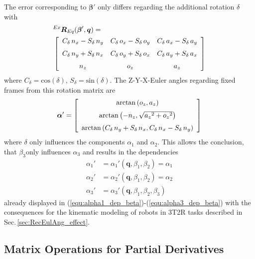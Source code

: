\documentclass[twocolumn,10pt]{IFTOMM}
\newcommand{\bm}[1]{\boldsymbol{#1}}
\newcommand{\rotmat}[2]{{{ }^{#1}\boldsymbol{R}}_{#2}}
\begin{document}
The error corresponding to $\bm{\beta}'$ only differs regarding the additional rotation $\delta$ with
%
\begin{align}
&\rotmat{Ex}{Eq}(\bm{\beta}',\bm{q})
= \\
&\left[ \begin {array}{ccc} { C_{\delta}}\,{n_x}-{ S_{\delta}}\,{ n_y}&{ C_{\delta}}\,{o_x}-{ S_{\delta}}\,{o_y}&{ C_{\delta}}\,{ a_x}-{ S_{\delta}}\,{a_y}\\ \noalign{\medskip}{ C_{\delta}}\,{n_y}+ { S_{\delta}}\,{n_x}&{ C_{\delta}}\,{o_y}+{ S_{\delta}}\,{o_x}&{  C_{\delta}}\,{a_y}+{ S_{\delta}}\,{a_x}\\ \noalign{\medskip}{ n_z}&{o_z}&{a_z}\end {array} \right] \nonumber
\end{align}
%
where $C_{\delta}=\mathrm{cos}(\delta)$, $S_{\delta}=\mathrm{sin}(\delta)$.
The Z-Y-X-Euler angles regarding fixed frames from this rotation matrix are
%
\begin{equation}
\bm{\alpha}' =
 \left[ \begin {array}{c} \arctan \left( {o_z},{a_z} \right)  \\
  \noalign{\medskip}\arctan \left( -{n_z},\sqrt {{{a_z}}^{2}+{{ o_z}}^{2}} \right) \\
  \noalign{\medskip}\arctan \left( {  C_{\delta}}\,{n_y}+{ S_{\delta}}\,{n_x},{ C_{\delta}}\,{n_x}-{  S_{\delta}}\,{n_y} \right) \end {array} \right] 
\end{equation}
%
where $\delta$  only influences the components $\alpha_1$ and $\alpha_2$.
This allows the conclusion, that $\beta_3$only influences $\alpha_3$ and results in the dependencies
%
\begin{align}
\alpha_1'&=\alpha_1'(\bm{q},\beta_1,\beta_2) =\alpha_1\\
\alpha_2'&=\alpha_2'(\bm{q},\beta_1,\beta_2) =\alpha_2\\
\alpha_3'&=\alpha_3'(\bm{q},\beta_1,\beta_2,\beta_3)
\end{align}
%
already displayed in (\ref{equ:alpha1_dep_beta})-(\ref{equ:alpha3_dep_beta}) with the consequences for the kinematic modeling of robots in 3T2R tasks described in Sec.\,\ref{sec:RecEulAng_effect}.

\subsection{Matrix Operations for Partial Derivatives}
\label{sec:appendix_gradient_matrix}
\end{document}

